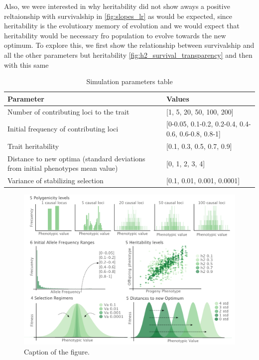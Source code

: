 \documentclass{article}
\begin{document}
Also, we were interested in why heritability did not show aways a positive reltaionship with survivalship in \ref{fig:slopes_lr} as would be expected, since heritability is the evolutioary memory of evolution and we would expect that heritability would be necessary fro population to evolve towards the new optimum. To explore this, we first show the relationship between survivalship and all the other parameters but heritability \ref{fig:h2_survival_transparency} and then with this same 


\begin{table}
\centering
\begin{tabularx}{\textwidth}[t]{XX} \toprule
{Parameter} & {Values} \\ \midrule
{Number of contributing loci to the trait} & {[1, 5, 20, 50, 100, 200]} \\ \midrule
{Initial frequency of contributing loci} & {[0-0.05, 0.1-0.2, 0.2-0.4, 0.4-0.6, 0.6-0.8, 0.8-1]}\\ \midrule
{Trait heritability} & {[0.1, 0.3, 0.5, 0.7, 0.9]} \\ \midrule
{Distance to new optima (standard deviations from initial phenotypes mean value)} & {[0, 1, 2, 3, 4]}\\ \midrule
{Variance of stabilizing selection} & {[0.1, 0.01, 0.001, 0.0001]} \\ \bottomrule
\end{tabularx}
\caption{Simulation parameters table}
\label{simulation_parameters_table}
\end{table}

\begin{figure}[b]
    \centering
    \includegraphics[width=1\textwidth]{figures/parameters.pdf}
    \caption{Caption of the figure.}
    \label{fig:parameters}
\end{figure}
\end{document}
